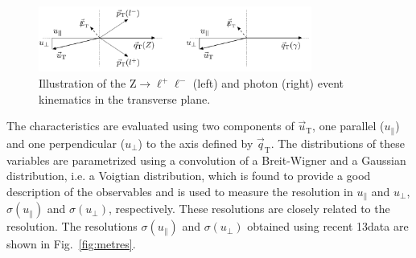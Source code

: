 \begin{figure}[htb]
\centering
\includegraphics[width=0.8\textwidth]{images/metZgamma.pdf}
\caption{Illustration of the Z$\to\ell^+\ell^-$ (left) and photon (right) event kinematics in the transverse plane.}\label{fig:metZgamma}
\end{figure}

The \MET characteristics are evaluated using two components of $\vec{u}_\mathrm{T}$, one parallel ($u_\parallel$) and one perpendicular ($u_\perp$) to the axis defined by $\vec{q}_\mathrm{T}$. The distributions of these variables are parametrized using a convolution of a Breit-Wigner and a Gaussian distribution, i.e. a Voigtian distribution, which is found to provide a good description of the observables and is used to measure the resolution in $u_\parallel$ and $u_\perp$, $\sigma(u_\parallel)$ and $\sigma(u_\perp)$, respectively. These resolutions are closely related to the \MET resolution. The resolutions $\sigma(u_\parallel)$ and $\sigma(u_\perp)$ obtained using recent 13\TeV data are shown in Fig.~\ref{fig:metres}.

